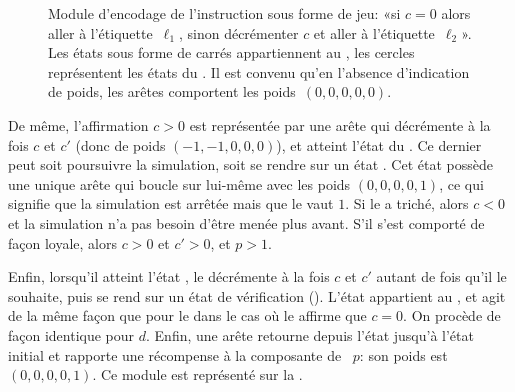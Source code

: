 \begin{figure}[ht]
\centering
{}
\caption[Module d'encodage de l'instruction \tjztest sous forme de jeu]{Module d'encodage de l'instruction \tjztest sous forme de jeu: «si $c=0$ alors aller à l'étiquette~$\ell_1$, sinon décrémenter $c$ et aller à l'étiquette~$\ell_2$». Les états sous forme de carrés appartiennent au \jo, les cercles représentent les états du \ji. Il est convenu qu'en l'absence d'indication de poids, les arêtes comportent les poids~$(0,0,0,0,0)$.}%
\label{tj:fig:zerotest}
\end{figure}

De même, l'affirmation $c>0$ est représentée par une arête qui décrémente à la fois $c$ et $c'$ (donc de poids $(-1,-1,0,0,0)$), et atteint l'état du \ji.
Ce dernier peut soit poursuivre la simulation, soit se rendre sur un état \tjstopq.
Cet état possède une unique arête qui boucle sur lui-même avec les poids $(0,0,0,0,1)$, ce qui signifie que la simulation est arrêtée mais que le  vaut $1$.
Si le \jo a triché, alors $c<0$ et la simulation n'a pas besoin d'être menée plus avant.
S'il s'est comporté de façon loyale, alors $c>0$ et $c'>0$, et $p>1$.

Enfin, lorsqu'il atteint l'état \tjhalt, le \jo décrémente à la fois $c$ et $c'$ autant de fois qu'il le souhaite, puis se rend sur un état de vérification (\tjcheck).
L'état \tjcheck appartient au \ji, et agit de la même façon que pour le \tjztest dans le cas où le \jo affirme que $c=0$.
On procède de façon identique pour $d$.
Enfin, une arête retourne depuis l'état \tjcheck jusqu'à l'état initial et rapporte une récompense à la composante de ~$p$: son poids est $(0,0,0,0,1)$.
Ce module est représenté sur la .

